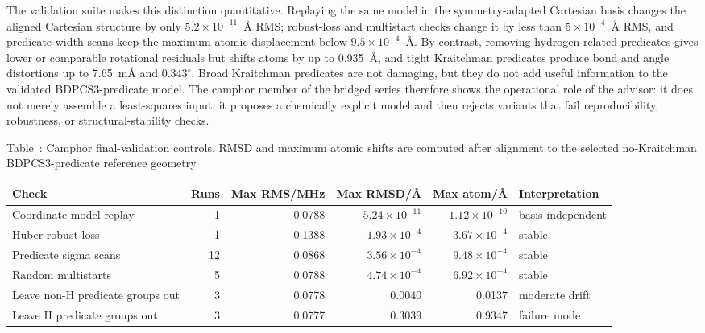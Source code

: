 \documentclass[aip,jcp,reprint,longbibliography,floatfix]{revtex4-2}
\begin{document}
The validation suite makes this distinction quantitative. Replaying the same
model in the symmetry-adapted Cartesian basis changes the aligned Cartesian
structure by only $5.2\times 10^{-11}$~\AA{} RMS; robust-loss and multistart
checks change it by less than $5\times10^{-4}$~\AA{} RMS, and predicate-width
scans keep the maximum atomic displacement below $9.5\times10^{-4}$~\AA{}.
By contrast, removing hydrogen-related predicates gives lower or comparable
rotational residuals but shifts atoms by up to 0.935~\AA{}, and tight
Kraitchman predicates produce bond and angle distortions up to 7.65~m\AA{}
and $0.343^\circ$. Broad Kraitchman predicates are not damaging, but they do
not add useful information to the validated BDPCS3-predicate model. The
camphor member of the bridged series therefore shows the operational role of
the advisor: it does not merely assemble a least-squares input, it proposes a
chemically explicit model and then rejects variants that fail reproducibility,
robustness, or structural-stability checks.

\begin{widetext}
\begin{center}
\label{tab:camphor-final-validation}
\parbox{0.96\textwidth}{\small\raggedright Table~\thetable: Camphor
final-validation controls. RMSD and maximum atomic shifts are computed after
alignment to the selected no-Kraitchman BDPCS3-predicate reference geometry.\par}
\smallskip
\footnotesize
\setlength{\tabcolsep}{4pt}
\begin{tabular}{lrrrrl}
\toprule
Check & Runs & Max RMS/MHz & Max RMSD/\AA{} & Max atom/\AA{} & Interpretation \\
\midrule
Coordinate-model replay & 1 & 0.0788 & $5.24\times10^{-11}$ & $1.12\times10^{-10}$ & basis independent \\
Huber robust loss & 1 & 0.1388 & $1.93\times10^{-4}$ & $3.67\times10^{-4}$ & stable \\
Predicate sigma scans & 12 & 0.0868 & $3.56\times10^{-4}$ & $9.48\times10^{-4}$ & stable \\
Random multistarts & 5 & 0.0788 & $4.74\times10^{-4}$ & $6.92\times10^{-4}$ & stable \\
Leave non-H predicate groups out & 3 & 0.0778 & 0.0040 & 0.0137 & moderate drift \\
Leave H predicate groups out & 3 & 0.0777 & 0.3039 & 0.9347 & failure mode \\
\bottomrule
\end{tabular}
\end{center}
\end{widetext}
\end{document}
